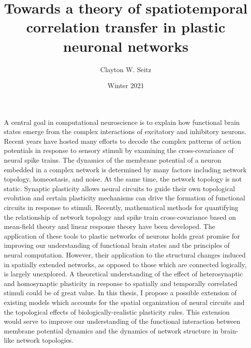 \documentclass{ucetd}
\title{Towards a theory of spatiotemporal correlation transfer in plastic neuronal networks}
\author{Clayton W. Seitz}
\date{Winter 2021}
\begin{document}
\maketitle

\makecopyright
\makeepigraph


\tableofcontents


\abstract

A central goal in computational neuroscience is to explain how functional brain states emerge from the complex interactions of excitatory and inhibitory neurons. Recent years have hosted many efforts to decode the complex patterns of action potentials in response to sensory stimuli by examining the cross-covariance of neural spike trains. The dynamics of the membrane potential of a neuron embedded in a complex network is determined by many factors including network topology, homeostasis, and noise. At the same time, the network topology is not static. Synaptic plasticity allows neural circuits to guide their own topological evolution and certain plasticity mechanisms can drive the formation of functional circuits in response to stimuli. Recently, mathematical methods for quantifying the relationship of network topology and spike train cross-covariance based on mean-field theory and linear response theory have been developed. The application of these tools to plastic networks of neurons holds great promise for improving our understanding of functional brain states and the principles of neural computation. However, their application to the structural changes induced in spatially extended networks, as opposed to those which are connected logically, is largely unexplored. A theoretical understanding of the effect of heterosynaptic and homosynaptic plasticity in response to spatially and temporally correlated stimuli could be of great value. In this thesis, I propose a possible extension of existing models which accounts for the spatial organization of neural circuits and the topological effects of biologically-realistic plasticity rules. This extension would serve to improve our understanding of the functional interaction between membrane potential dynamics and the dynamics of network structure in brain-like network topologies.
\clearpage
\end{document}
